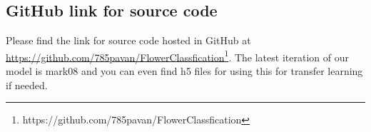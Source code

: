 \documentclass[a4paper,19pt]{article}
\begin{document}
\subsection{GitHub link for source code}
Please find the link for source code hosted in GitHub at 
\href{https://github.com/785pavan/FlowerClassfication}{https://github.com/785pavan/FlowerClassfication}\footnote{https://github.com/785pavan/FlowerClassfication}. The latest iteration of our model is mark08 and you can even find h5 files for using this for transfer learning if needed.






\newpage

\end{document}
